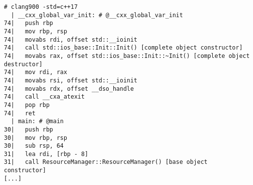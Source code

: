 \begin{lstlisting}[language={},numbers=none,title=\href{https://godbolt.org/z/3QqmDm}{\texttt{godbolt.org/z/3QqmDm}}]
# clang900 -std=c++17
  | __cxx_global_var_init: # @__cxx_global_var_init
74|   push rbp
74|   mov rbp, rsp
74|   movabs rdi, offset std::__ioinit
74|   call std::ios_base::Init::Init() [complete object constructor]
74|   movabs rax, offset std::ios_base::Init::~Init() [complete object destructor]
74|   mov rdi, rax
74|   movabs rsi, offset std::__ioinit
74|   movabs rdx, offset __dso_handle
74|   call __cxa_atexit
74|   pop rbp
74|   ret
  | main: # @main
30|   push rbp
30|   mov rbp, rsp
30|   sub rsp, 64
31|   lea rdi, [rbp - 8]
31|   call ResourceManager::ResourceManager() [base object constructor]
[...]
\end{lstlisting}
